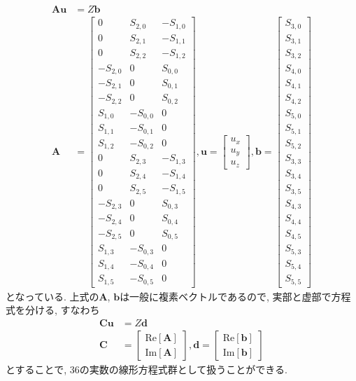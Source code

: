 \documentclass[a4j]{jsarticle}
\begin{document}
\begin{align}
\bm{A}\bm{u}&=Z\bm{b}\\
\bm{A}
&=
\begin{bmatrix}
0&S_{2,0}&-S_{1,0}\\
0&S_{2,1}&-S_{1,1}\\
0&S_{2,2}&-S_{1,2}\\
-S_{2,0}&0&S_{0,0}\\
-S_{2,1}&0&S_{0,1}\\
-S_{2,2}&0&S_{0,2}\\
S_{1,0}&-S_{0,0}&0\\
S_{1,1}&-S_{0,1}&0\\
S_{1,2}&-S_{0,2}&0\\
%
0&S_{2,3}&-S_{1,3}\\
0&S_{2,4}&-S_{1,4}\\
0&S_{2,5}&-S_{1,5}\\
%
-S_{2,3}&0&S_{0,3}\\
-S_{2,4}&0&S_{0,4}\\
-S_{2,5}&0&S_{0,5}\\
%
S_{1,3}&-S_{0,3}&0\\
S_{1,4}&-S_{0,4}&0\\
S_{1,5}&-S_{0,5}&0
\end{bmatrix}, 
\bm{u}
=
\begin{bmatrix}
u_{x}\\
u_{y}\\
u_{z}
\end{bmatrix}, 
\bm{b}
=
\begin{bmatrix}
S_{3,0}\\
S_{3,1}\\
S_{3,2}\\
S_{4,0}\\
S_{4,1}\\
S_{4,2}\\
S_{5,0}\\
S_{5,1}\\
S_{5,2}\\
%
S_{3,3}\\
S_{3,4}\\
S_{3,5}\\
%
S_{4,3}\\
S_{4,4}\\
S_{4,5}\\
%
S_{5,3}\\
S_{5,4}\\
S_{5,5}
\end{bmatrix}
\end{align}
となっている. 上式の$\bm{A}$, $\bm{b}$は一般に複素ベクトルであるので, 実部と虚部で方程式を分ける, すなわち
\begin{align}
\bm{C}\bm{u}&=Z\bm{d}\label{eqn:Cu=Zd}\\
\bm{C}&=
\begin{bmatrix}
\mathrm{Re}[\bm{A}]\\
\mathrm{Im}[\bm{A}]
\end{bmatrix}, 
\bm{d}=
\begin{bmatrix}
\mathrm{Re}[\bm{b}]\\
\mathrm{Im}[\bm{b}]
\end{bmatrix}
\end{align}
とすることで, 36の実数の線形方程式群として扱うことができる. 
\end{document}
